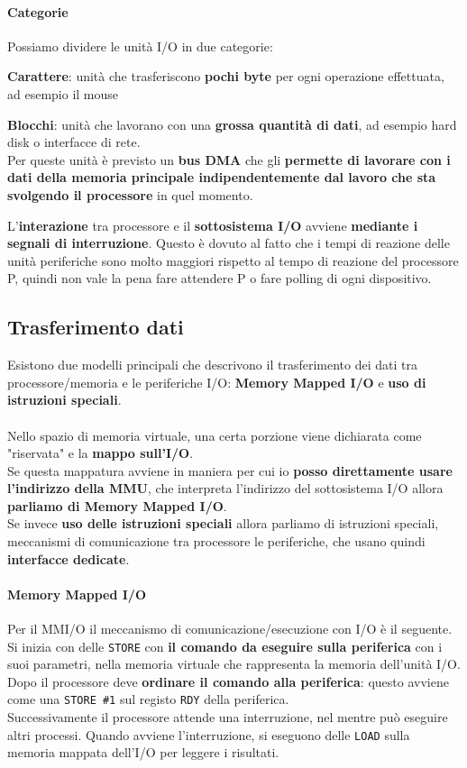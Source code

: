 \documentclass[10pt]{report}
\begin{document}
\paragraph{Categorie} Possiamo dividere le unità I/O in due categorie:
\begin{list}{}{}
	\item \textbf{Carattere}: unità che trasferiscono \textbf{pochi byte} per ogni operazione effettuata, ad esempio il mouse
	\item \textbf{Blocchi}: unità che lavorano con una \textbf{grossa quantità di dati}, ad esempio hard disk o interfacce di rete.\\
	Per queste unità è previsto un \textbf{bus DMA} che gli \textbf{permette di lavorare con i dati della memoria principale indipendentemente dal lavoro che sta svolgendo il processore} in quel momento.
\end{list}
L'\textbf{interazione} tra processore e il \textbf{sottosistema I/O} avviene \textbf{mediante i segnali di interruzione}. Questo è dovuto al fatto che i tempi di reazione delle unità periferiche sono molto maggiori rispetto al tempo di reazione del processore P, quindi non vale la pena fare attendere P o fare polling di ogni dispositivo.
\subsection{Trasferimento dati}
Esistono due modelli principali che descrivono il trasferimento dei dati tra processore/memoria e le periferiche I/O: \textbf{Memory Mapped I/O} e \textbf{uso di istruzioni speciali}.\\\\
Nello spazio di memoria virtuale, una certa porzione viene dichiarata come "riservata" e la \textbf{mappo sull'I/O}.\\
Se questa mappatura avviene in maniera per cui io \textbf{posso direttamente usare l'indirizzo della MMU}, che interpreta l'indirizzo del sottosistema I/O allora \textbf{parliamo di Memory Mapped I/O}.\\
Se invece \textbf{uso delle istruzioni speciali} allora parliamo di istruzioni speciali, meccanismi di comunicazione tra processore le periferiche, che usano quindi \textbf{interfacce dedicate}.
\paragraph{Memory Mapped I/O} Per il MMI/O il meccanismo di comunicazione/esecuzione con I/O è il seguente.\\
Si inizia con delle \texttt{STORE} con \textbf{il comando da eseguire sulla periferica} con i suoi parametri, nella memoria virtuale che rappresenta la memoria dell'unità I/O.\\
Dopo il processore deve \textbf{ordinare il comando alla periferica}: questo avviene come una \texttt{STORE \#1} sul registo \texttt{RDY} della periferica.\\
Successivamente il processore attende una interruzione, nel mentre può eseguire altri processi. Quando avviene l'interruzione, si eseguono delle \texttt{LOAD} sulla memoria mappata dell'I/O per leggere i risultati.
\pagebreak
\end{document}
